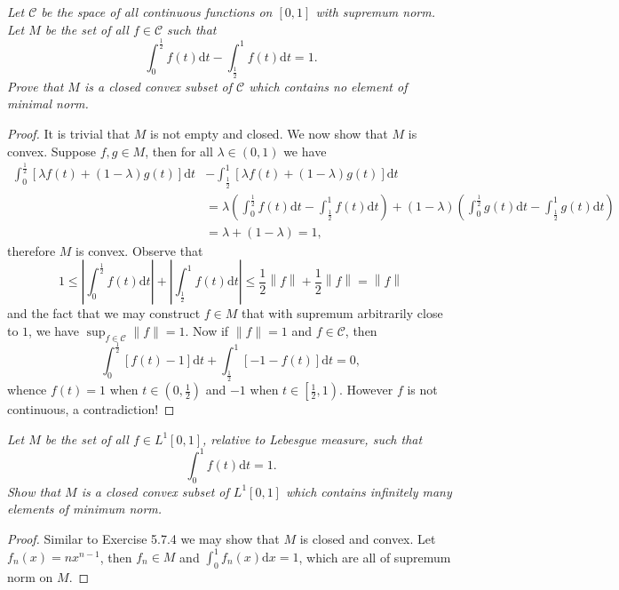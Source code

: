 \begin{problem}\em
Let $\mathcal{C}$ be the space of all continuous functions on $[0,1]$ with supremum norm. Let $M$ be the set of all $f\in\mathcal{C}$ such that 
$$
\int_0^{\frac{1}{2}}{f\left( t \right) \mathrm{d}t}-\int_{\frac{1}{2}}^1{f\left( t \right) \mathrm{d}t}=1.
$$
Prove that $M$ is a closed convex subset of $\mathcal{C}$ which contains no element of minimal norm.
\end{problem}
\begin{proof}
It is trivial that $M$ is not empty and closed. We now show that $M$ is convex. Suppose $f,g\in M$, then for all $\lambda\in(0,1)$ we have 
$$
\begin{aligned}
\int_0^{\frac{1}{2}}{\left[ \lambda f\left( t \right) +\left( 1-\lambda \right) g\left( t \right) \right] \mathrm{d}t}&-\int_{\frac{1}{2}}^1{\left[ \lambda f\left( t \right) +\left( 1-\lambda \right) g\left( t \right) \right] \mathrm{d}t}
\\
&=\lambda \left( \int_0^{\frac{1}{2}}{f\left( t \right) \mathrm{d}t}-\int_{\frac{1}{2}}^1{f\left( t \right) \mathrm{d}t} \right) +\left( 1-\lambda \right) \left( \int_0^{\frac{1}{2}}{g\left( t \right) \mathrm{d}t}-\int_{\frac{1}{2}}^1{g\left( t \right) \mathrm{d}t} \right) 
\\
&=\lambda +\left( 1-\lambda \right) =1,
\end{aligned}
$$
therefore $M$ is convex. Observe that 
$$
1\le \left| \int_0^{\frac{1}{2}}{f\left( t \right) \mathrm{d}t} \right|+\left| \int_{\frac{1}{2}}^1{f\left( t \right) \mathrm{d}t} \right|\le \frac{1}{2}\left\| f \right\| +\frac{1}{2}\left\| f \right\| =\left\| f \right\| 
$$
and the fact that we may construct $f\in M$ that with supremum arbitrarily close to $1$, we have $\sup_{f\in\mathcal{C}}\|f\|=1$. Now if $\|f\|=1$ and $f\in\mathcal{C}$, then 
$$
\int_0^{\frac{1}{2}}{\left[ f\left( t \right) -1 \right] \mathrm{d}t}+\int_{\frac{1}{2}}^1{\left[ -1-f\left( t \right) \right] \mathrm{d}t}=0,
$$
whence $f(t)=1$ when $t\in\left(0,\frac{1}{2}\right)$ and $-1$ when $t\in\left[\frac{1}{2},1\right)$. However $f$ is not continuous, a contradiction!
\end{proof}
\begin{problem}\em
Let $M$ be the set of all $f\in L^1[0,1]$, relative to Lebesgue measure, such that 
$$
\int_0^1{f\left( t \right) \mathrm{d}t}=1.
$$
Show that $M$ is a closed convex subset of $L^1[0,1]$ which contains infinitely many elements of minimum norm.
\end{problem}
\begin{proof}
Similar to Exercise 5.7.4 we may show that $M$ is closed and convex. Let $f_n(x)=nx^{n-1}$, then $f_n\in M$ and $\int_0^1f_n(x)\mathrm{d}x=1$, which are all of supremum norm on $M$.
\end{proof}
